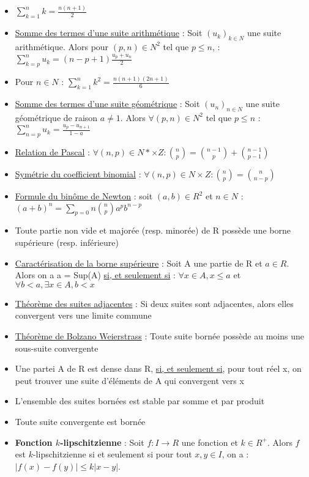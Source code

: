 \documentclass{article}
\begin{document}
\begin{itemize}[label=$\ast$]
	\item \( \sum_{k=1}^{n}k = \frac{n(n+1)}{2} \)
	\item \underline{Somme des termes d'une suite arithmétique} : Soit \( (u_k)_{k \in N} \) une suite arithmétique. Alors pour \( (p,n) \in N^2 \) tel que \( p \leq n \), : \(  \sum_{k=p}^{n}u_k = (n-p+1) \frac{u_p + u_n}{2} \)
	\item Pour \(n \in N \) : \( \sum_{k=1}^n k^2 = \frac{n(n+1)(2n+1)}{6} \)
	\item \underline{Somme des termes d'une suite géométrique} : Soit \((u_n)_{n \in N} \) une suite géométrique de raison \( a \neq 1\). Alors \( \forall (p,n) \in N^2 \) tel que \(p \leq n \) : \( \sum_{n=p}^n u_k = \frac{u_p - u_{n+1}}{1-a} \)
	\item \underline{Relation de Pascal} : \( \forall{(n,p) \in N* \times Z} : \binom{n}{p} = \binom{n-1}{p} + \binom{n-1}{p-1} \)
	\item \underline{Symétrie du coefficient binomial} : \( \forall{(n,p) \in N \times Z} : \binom{n}{p} = \binom{n}{n-p} \)
	\item \underline{Formule du binôme de Newton} : soit \((a,b) \in R^2\) et \(n \in N\) : \((a+b)^n = \sum_{p=0}n \binom{n}{p}a^p b^{n-p} \)
	\item Toute partie non vide et majorée (resp. minorée) de R possède une borne supérieure (resp. inférieure)
	\item \underline{Caractérisation de la borne supérieure} : Soit A une partie de R et \(a \in R \). Alors on a a = Sup(A) \underline{si, et seulement si} : \( \forall x \in A, x \leq a\) et \( \forall b<a, \exists x \in A, b<x \)
	\item \underline{Théorème des suites adjacentes} : Si deux suites sont adjacentes, alors elles convergent vers une limite commune
	\item \underline{Théorème de Bolzano Weierstrass} : Toute suite bornée possède au moins une sous-suite convergente
 	\item Une partei A de R est dense dans R, \underline{si, et seulement si}, pour tout réel x, on peut trouver une suite d'éléments de A qui convergent vers x
	\item L'ensemble des suites bornées est stable par somme et par produit
	\item Toute suite convergente est bornée
	\item \textbf{Fonction \( k \)-lipschitzienne} : Soit \( f: I \to R \) une fonction et \( k \in R^+ \). Alors \( f \) est \( k \)-lipschitzienne si et seulement si pour tout \( x, y \in I \), on a : \( |f(x) - f(y)| \leq k |x - y| \).

\end{itemize}
\end{document}
